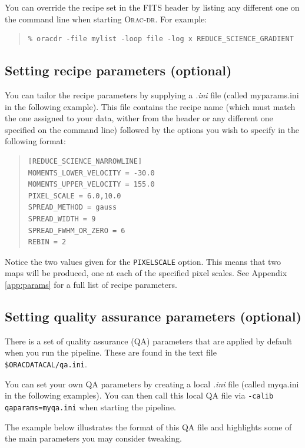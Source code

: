 \documentclass[twoside,11pt]{article}
\newcommand{\htmladdnormallink}[2]{#1}
\renewcommand{\_}{\texttt{\symbol{95}}}
\newenvironment{myquote}{
   \color{MidnightBlue}\begin{quote}\begin{small}}{
   \end{small}\end{quote}
}
\newcommand{\oracdr}{\htmladdnormallink{\textsc{Orac-dr}}{http://www.oracdr.org/oracdr}}
\newcommand{\param}[1]{\texttt{#1}}
\renewenvironment{myquote}{
      \begin{quote}\begin{small}}{
      \end{small}\end{quote}
   }
\begin{document}
You can override the recipe set in the FITS header by listing any different
one on the command line when starting \oracdr. For example:
\begin{myquote}
\begin{verbatim}
% oracdr -file mylist -loop file -log x REDUCE_SCIENCE_GRADIENT
\end{verbatim}
\end{myquote}

\subsection{Setting recipe parameters (optional)}
\label{sec:recpars}
You can tailor the recipe parameters by supplying a  \textit{.ini} file (called myparams.ini in the following example). This file contains the recipe name (which must match the one assigned to your data, wither from the header or any different one specified on the command line) followed by the options you wish to specify in the following format:

\vspace{0.2cm}
\begin{quote}
\begin{verbatim}
[REDUCE_SCIENCE_NARROWLINE]
MOMENTS_LOWER_VELOCITY = -30.0
MOMENTS_UPPER_VELOCITY = 155.0
PIXEL_SCALE = 6.0,10.0
SPREAD_METHOD = gauss
SPREAD_WIDTH = 9
SPREAD_FWHM_OR_ZERO = 6
REBIN = 2
\end{verbatim}
\end{quote}

Notice the two values given for the  \param{PIXEL\_SCALE} option. This means that two maps will be produced, one at each of the specified pixel scales. See Appendix \ref{app:params} for a full list of recipe parameters.


\subsection{Setting quality assurance parameters (optional)}
\label{sec:qa}
There is a set of quality assurance (QA) parameters that are applied by default when you run the pipeline. These are found in the text file \param{\$ORAC\_DATA\_CAL/qa.ini}.

You can set your own QA parameters by creating a local \textit{.ini} file (called myqa.ini in the following examples). You can then call this local QA file via \param{-calib qaparams=myqa.ini} when starting the pipeline.

The example below illustrates the format of this QA file and highlights some of the main parameters you may consider tweaking.
\end{document}

